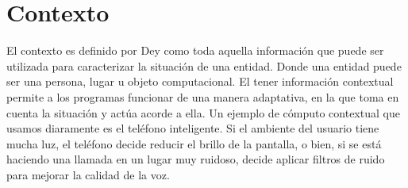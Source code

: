 \documentclass[letterpaper,12pt]{cicese}
\begin{document}
			\section{Contexto}
				El contexto es definido por Dey \citep{Dey2001} como toda aquella informaci\'on que puede ser utilizada para caracterizar la situaci\'on de una entidad. Donde una
				entidad puede ser una persona, lugar u objeto computacional. El tener informaci\'on contextual permite a los programas funcionar de una manera adaptativa,
				en la que toma en cuenta la situaci\'on y act\'ua acorde a ella. Un ejemplo de c\'omputo contextual que usamos diaramente es el tel\'efono inteligente.
				Si el ambiente del usuario tiene mucha luz, el tel\'efono decide reducir el brillo de la pantalla, o bien, si se est\'a haciendo una llamada en un lugar muy ruidoso,
				decide aplicar filtros de ruido para mejorar la calidad de la voz.
		
\end{document}
